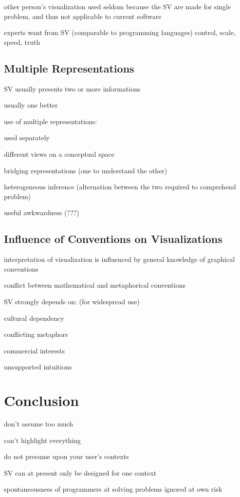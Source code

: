 \documentclass[11pt, a4paper, ngerman, twoside]{article}
\theoremstyle{plain}\newtheorem{Lemma}{Lemma}
\theoremstyle{plain}\newtheorem{Satz}[Lemma]{Satz}
\theoremstyle{definition}\newtheorem{Definition}[Lemma]{Definition}
\theoremstyle{definition}\newtheorem*{Beispiel}{Beispiel}
\theoremstyle{remark}\newtheorem*{Bemerkung}{Bemerkung}
\begin{document}
other person’s visualization used seldom because the SV are made for single problem, and thus not applicable to current software

experts want from SV (comparable to programming languages) control, scale, speed, truth

\subsection{Multiple Representations}

SV usually presents two or more informations

usually one better

use of multiple representations:

used separately

different views on a conceptual space

bridging representations (one to understand the other)

heterogeneous inference (alternation between the two required to comprehend problem)

useful awkwardness (???)

\subsection{Influence of Conventions on Visualizations}

interpretation of visualization is influenced by general knowledge of graphical conventions

conflict between mathematical and metaphorical conventions

SV strongly depends on: (for widespread use)

cultural dependency

conflicting metaphors

commercial interests

unsupported intuitions

\section{Conclusion}

don’t assume too much

can’t highlight everything

do not presume upon your user’s contexts

SV can at present only be designed for one context

spontaneousness of programmers at solving problems ignored at own risk



\end{document}
